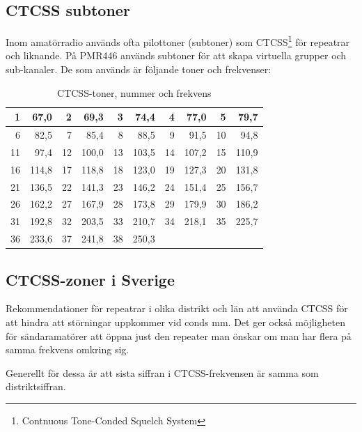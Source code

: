 \subsection{CTCSS subtoner}

Inom amatörradio används ofta pilottoner (subtoner) som CTCSS\footnote{Contnuous Tone-Conded Squelch System} för repeatrar och liknande. På PMR446 används subtoner för att skapa virtuella grupper och sub-kanaler. De som används är följande toner och frekvenser:

\begin{table}[H]
\centering
\begin{tabular}{rr|rr|rr|rr|rr}
	 1 &  67,0 &  2 &  69,3 &  3 &  74,4 &  4 &  77,0 &  5 &  79,7 \\ \hline
	 6 &  82,5 &  7 &  85,4 &  8 &  88,5 &  9 &  91,5 & 10 &  94,8 \\ \hline
	11 &  97,4 & 12 & 100,0 & 13 & 103,5 & 14 & 107,2 & 15 & 110,9 \\ \hline
	16 & 114,8 & 17 & 118,8 & 18 & 123,0 & 19 & 127,3 & 20 & 131,8 \\ \hline
	21 & 136,5 & 22 & 141,3 & 23 & 146,2 & 24 & 151,4 & 25 & 156,7 \\ \hline
	26 & 162,2 & 27 & 167,9 & 28 & 173,8 & 29 & 179,9 & 30 & 186,2 \\ \hline
	31 & 192,8 & 32 & 203,5 & 33 & 210,7 & 34 & 218,1 & 35 & 225,7 \\ \hline
	36 & 233,6 & 37 & 241,8 & 38 & 250,3 &    &       &    &
\end{tabular}
\caption{CTCSS-toner, nummer och frekvens}
\end{table}

\subsection{CTCSS-zoner i Sverige}

Rekommendationer för repeatrar i olika distrikt och län att använda CTCSS för att hindra att störningar uppkommer vid conds mm. Det ger också möjligheten för sändaramatörer att öppna just den repeater man önskar om man har flera på samma frekvens omkring sig.

Generellt för dessa är att sista siffran i CTCSS-frekvensen är samma som distriktsiffran.

